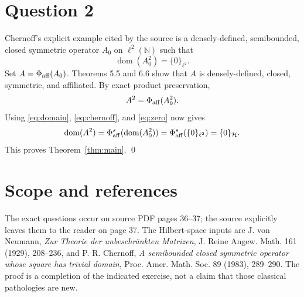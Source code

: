\documentclass[11pt]{article}
\newcommand{\domn}{\operatorname{dom}}
\begin{document}
\section{Question 2}

Chernoff's explicit example cited by the source is a densely-defined,
semibounded, closed symmetric operator $A_0$ on $\ell^2(\mathbb N)$ such that
\begin{equation}\label{eq:chernoff}
 \domn(A_0^2)=\{0\}_{\ell^2}.
\end{equation}
Set $A=\Phi_{\rm aff}(A_0)$.  Theorems 5.5 and 6.6 show that $A$ is
densely-defined, closed, symmetric, and affiliated.
By exact product preservation,
\[
 A^2=\Phi_{\rm aff}(A_0^2).
\]
Using \eqref{eq:domain}, \eqref{eq:chernoff}, and \eqref{eq:zero} now gives
\[
 \domn(A^2)
 =\Phi_{\rm aff}^s(\domn(A_0^2))
 =\Phi_{\rm aff}^s(\{0\}_{\ell^2})
 =\{0\}_{\mathcal H}.
\]
This proves Theorem~\ref{thm:main}. \qed

\section*{Scope and references}

The exact questions occur on source PDF pages 36--37; the source explicitly
leaves them to the reader on page 37.  The Hilbert-space inputs are J. von
Neumann, \emph{Zur Theorie der unbeschr\"ankten Matrizen}, J. Reine Angew.
Math. 161 (1929), 208--236, and P. R. Chernoff, \emph{A semibounded closed
symmetric operator whose square has trivial domain}, Proc. Amer. Math. Soc.
89 (1983), 289--290.  The proof is a completion of the indicated exercise,
not a claim that those classical pathologies are new.
\end{document}
